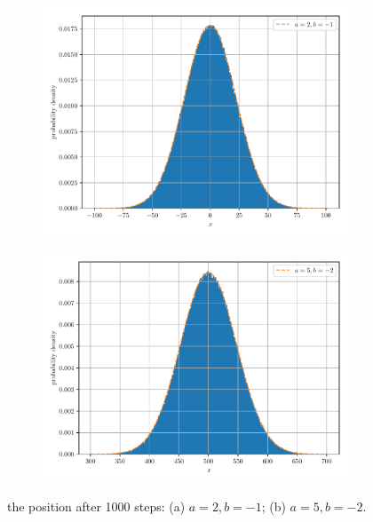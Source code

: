 \documentclass[paper=a4, fontsize=11pt]{scrartcl} %
\numberwithin{equation}{section} %
\numberwithin{figure}{section} %
\numberwithin{table}{section} %
\begin{document}
\begin{figure}[!htbp]
	\centering
	\begin{subfigure}[b]{0.495\textwidth}
		\centering
		\includegraphics[width=\linewidth]{figure_1_a.pdf}
		\caption{}
	\end{subfigure}
	\begin{subfigure}[b]{0.495\textwidth}
		\centering
		\includegraphics[width=\linewidth]{figure_1_b.pdf}
		\caption{}
	\end{subfigure}
	\caption{the position after 1000 steps: (a) \(a=2,b=-1\); (b) \(a=5,b=-2\).}
	\label{fig:random_1}
\end{figure}
\par
\end{document}
